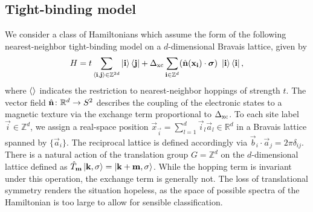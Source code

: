 \documentclass[
    10pt,
    aps,
    prb,
    twocolumn,
    floatfix,
    superscriptaddress,
]{revtex4-2}
\begin{document}
\subsection{Tight-binding model}
We consider a class of Hamiltonians which assume the form of the following nearest-neighbor tight-binding model on a $d$-dimensional Bravais lattice, given by
\begin{align}
    H  = t \sum_{\braket{\mathbf{i},\mathbf{j}} \in \mathbb{Z}^{2d}} \ket{\mathbf{i}}\bra{\mathbf{j}}
    + \Delta_\mathrm{xc}\sum_{\mathbf{i} \in \mathbb{Z}^d}  (\hat{\mathbf{n}} (\mathbf{x}_{\mathbf{i}}) \cdot \boldsymbol{\sigma}) ~ \ket{\mathbf{i}}\bra{\mathbf{i}} ,
    \label{eq:hamiltonian}
\end{align}
where $\braket{}$ indicates the restriction to nearest-neighbor hoppings of strength $t$.
The vector field $\hat{\mathbf{n}}\colon \mathbb{R}^d \to S^2$ describes the coupling of the electronic states to a magnetic texture via the exchange term proportional to $\Delta_\mathrm{xc}$. 
To each site label $\vec{i} \in \mathbb{Z}^d$, we assign a real-space position $\vec{x}_\vec{i} = \sum_{l=1}^d \vec{i}_l \vec{a}_l \in \mathbb{R}^d$ in a Bravais lattice spanned by $\lbrace \vec{a}_i \rbrace$. 
The reciprocal lattice is defined accordingly via $ \vec{b}_i \cdot \vec{a}_j  = 2\pi \delta_{ij}$.
There is a natural action of the translation group $G = \mathbb{Z}^d$ on the $d$-dimensional lattice defined as
$
    \hat{T}_{\mathbf{m}} \ket{\mathbf{k}, \sigma}  =  \ket{\mathbf{k}+ \mathbf{m}, \sigma}
$.
While the hopping term is invariant under this operation, the exchange term is generally not.
The loss of translational symmetry renders the situation hopeless, as the space of possible spectra of the Hamiltonian is too large to allow for sensible classification.
\end{document}
